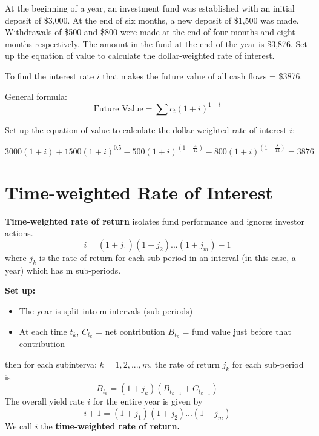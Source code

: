 \begin{example}
    At the beginning of a year, an investment fund was established with an initial deposit of \$3,000.
    At the end of six months, a new deposit of \$1,500 was made. Withdrawals of \$500 and \$800 were
    made at the end of four months and eight months respectively. The amount in the fund at the end
    of the year is \$3,876. Set up the equation of value to calculate the dollar-weighted rate of interest. 
    \newline
    \begin{solution}
        To find the interest rate $i$ that makes the future value of all cash flows = \$3876. 

        General formula: 
        \[
            \text{Future Value} = \sum c_t (1+i)^{1-t}
        \]

        Set up the equation of value to calculate the dollar-weighted rate of interest $i$:

        \[
        3000(1 + i) 
        + 1500(1 + i)^{0.5} 
        - 500(1 + i)^{(1 - \frac{4}{12})}
        - 800(1 + i)^{(1 - \frac{8}{12})} 
        = 3876
        \]
    \end{solution}
\end{example}


\section{Time-weighted Rate of Interest}
\begin{definition}
    \textbf{Time-weighted rate of return} isolates fund performance and ignores investor actions. 
    \[ i = (1+j_1)(1+j_2)...(1+j_m) - 1 \]
    where $j_k$ is the rate of return for each sub-period in an interval (in this case, a year) which has m sub-periods.
\end{definition}

\begin{comments}
    \textbf{Set up: } \\
    \begin{itemize}
        \item The year is split into m intervals (sub-periods)
        \item At each time $t_k$, 
            \subitem  $C_{t_k}$ = net contribution
            \subitem  $B_{t_k}$ = fund value just before that contribution
    \end{itemize}

    then for each subinterva; $k = 1,2,...,m$, the rate of return $j_k$ for each sub-period is
    \[ B_{t_k} = (1+j_k)(B_{t_{k-1}} + C_{t_{k-1}}) \]
    The overall yield rate $i$ for the entire year is given by
    \[ i + 1 = (1+j_1)(1+j_2)...(1+j_m) \]
    We call $i$ the \textbf{time-weighted rate of return.}

\end{comments}


